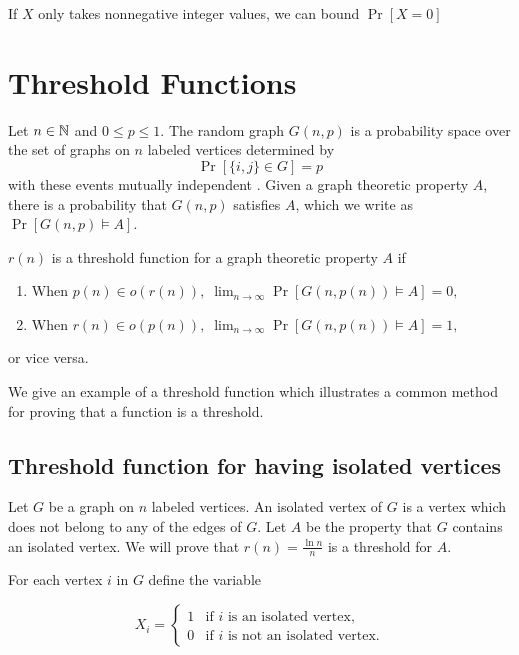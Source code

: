 If $X$ only takes nonnegative integer values, we can bound $\Pr[X = 0]$

\section{Threshold Functions}\label{sec:probmet:threshold}

Let $n \in \mathbb{N}$ and $0 \leq p \leq 1$. The random graph $G(n, p)$ is a probability space over the set of graphs on $n$ labeled vertices determined by
\[\Pr[\{i, j\} \in G] = p\] 
with these events mutually independent \cite{alon2016probabilistic}. Given a graph theoretic property $A$, there is a probability that $G(n, p)$ satisfies $A$, which we write as $\Pr[G(n, p) \vDash A]$. 

\begin{definition}
    $r(n)$ is a threshold function for a graph theoretic property $A$ if 
    \begin{enumerate}
        \item When \(p(n) \in o(r(n)), \; \lim_{n \to \infty} \Pr[G(n, p(n)) \vDash A] = 0,\)
        \item When \(r(n) \in o(p(n)), \;  \lim_{n \to \infty} \Pr[G(n, p(n)) \vDash A] = 1,\) 
    \end{enumerate}
    or vice versa. \cite{alon2016probabilistic}
\end{definition}

We give an example of a threshold function which illustrates a common method for proving that a function is a threshold. \par

\subsection{Threshold function for having isolated vertices}

Let $G$ be a graph on $n$ labeled vertices. An isolated vertex of $G$ is a vertex which does not belong to any of the edges of $G$. Let $A$ be the property that $G$ contains an isolated vertex. We will prove that $\displaystyle{r(n) = \frac{\ln n}{n}}$ is a threshold for $A$. \par

For each vertex $i$ in $G$ define the variable 

\[X_i = 
\left\{
	\begin{array}{ll}
		1  & \mbox{if } i \text{ is an isolated vertex,} \\
		0 & \mbox{if } i \text{ is not an isolated vertex.}
	\end{array}
\right.
\]

